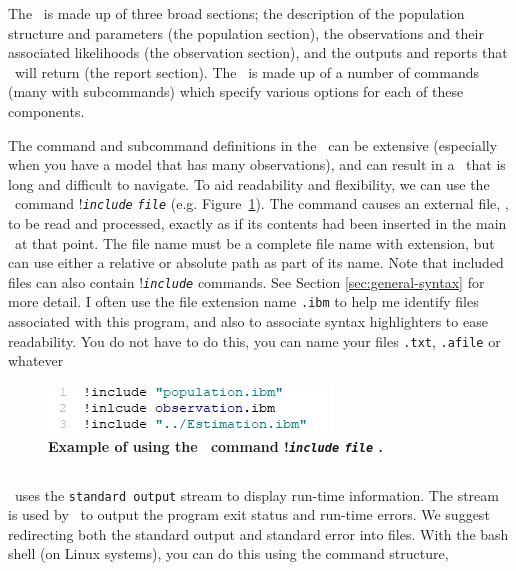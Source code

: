The \config\ is made up of three broad sections; the description of the population structure and parameters (the population section), the observations and their associated likelihoods (the observation section), and the outputs and reports that \IBM\ will return (the report section). The \config\ is made up of a number of commands (many with subcommands) which specify various options for each of these components.

The command and subcommand definitions in the \config\ can be extensive (especially when you have a model that has many observations), and can result in a \config\ that is long and difficult to navigate. To aid readability and flexibility, we can use the \config\ command !\texttt{\emph{include}} \texttt{\emph{file}}  (e.g. Figure~\ref{fig:config_file_1}). The command causes an external file, , to be read and processed, exactly as if its contents had been inserted in the main \config\ at that point. The file name must be a complete file name with extension, but can use either a relative or absolute path as part of its name. Note that included files can also contain !\texttt{\emph{include}} commands. See Section \ref{sec:general-syntax} for more detail. I often use the file extension name \texttt{.ibm} to help me identify files associated with this program, and also to associate syntax highlighters to ease readability. You do not have to do this, you can name your files \texttt{.txt}, \texttt{.afile} or whatever


\vspace*{3mm}
\begin{figure}[H]
	\includegraphics[scale=1]{Figures/config.png}
	\caption{\textbf{Example of using the \config\ command !\texttt{\emph{include}}
			\texttt{\emph{file}} .}}\label{fig:config_file_1}
\end{figure}

\subsection{\label{sec:redirecting-stdout}}

\IBM\ uses the \texttt{standard output} stream to display run-time information. The  stream is used by \IBM\ to output the program exit status and run-time errors. We suggest redirecting both the standard output and standard error into files. With the bash shell (on Linux systems), you can do this using the command structure,

